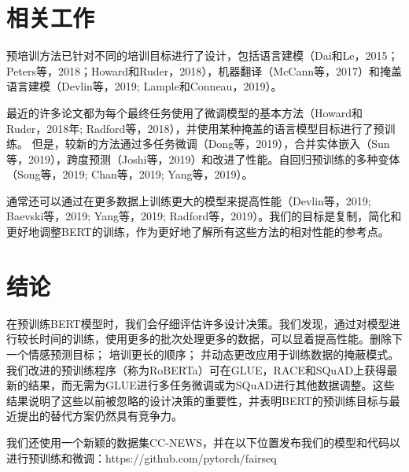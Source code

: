 \documentclass[lang=cn,11pt,a4paper,twocolumn]{elegantpaper}
\begin{document}
\section{相关工作}
预培训方法已针对不同的培训目标进行了设计，包括语言建模（Dai和Le，2015；Peters等，2018；Howard和Ruder，2018），机器翻译（McCann等，2017）和掩盖语言建模（Devlin等，2019; Lample和Conneau，2019）。

最近的许多论文都为每个最终任务使用了微调模型的基本方法（Howard和Ruder，2018年; Radford等，2018），并使用某种掩盖的语言模型目标进行了预训练。
但是，较新的方法通过多任务微调（Dong等，2019），合并实体嵌入（Sun等，2019），跨度预测（Joshi等，2019）和改进了性能。自回归预训练的多种变体（Song等，2019; Chan等，2019; Yang等，2019）。

通常还可以通过在更多数据上训练更大的模型来提高性能（Devlin等，2019; Baevski等，2019; Yang等，2019; Radford等，2019）。我们的目标是复制，简化和更好地调整BERT的训练，作为更好地了解所有这些方法的相对性能的参考点。

\section{结论}
在预训练BERT模型时，我们会仔细评估许多设计决策。我们发现，通过对模型进行较长时间的训练，使用更多的批次处理更多的数据，可以显着提高性能。删除下一个情感预测目标； 培训更长的顺序； 并动态更改应用于训练数据的掩蔽模式。我们改进的预训练程序（称为RoBERTa）可在GLUE，RACE和SQuAD上获得最新的结果，而无需为GLUE进行多任务微调或为SQuAD进行其他数据调整。这些结果说明了这些以前被忽略的设计决策的重要性，并表明BERT的预训练目标与最近提出的替代方案仍然具有竞争力。

我们还使用一个新颖的数据集CC-NEWS，并在以下位置发布我们的模型和代码以进行预训练和微调：https://github.com/pytorch/fairseq



\end{document}

